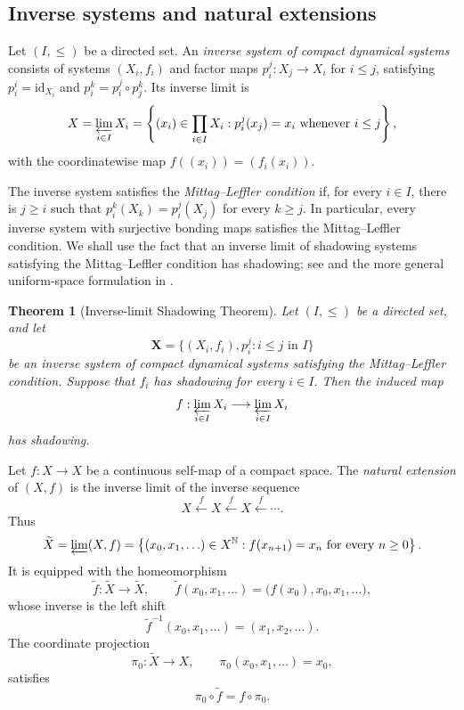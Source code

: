 \documentclass[12pt]{amsart}
\newtheorem{theorem}{Theorem}[section]
\theoremstyle{definition}
\numberwithin{equation}{section}
\theoremstyle{remark}
\def\id{{\text{id}}}
\begin{document}
\subsection{Inverse systems and natural extensions}

Let $(I,\leq)$ be a directed set. An \emph{inverse system of compact dynamical
systems} consists of systems $(X_i,f_i)$ and factor maps
$p_i^j:X_j\to X_i$ for $i\leq j$, satisfying
$p_i^i=\id_{X_i}$ and $p_i^k=p_i^j\circ p_j^k$. Its inverse limit is
\[
X=\varprojlim_{i\in I}X_i
=
\left\{(x_i)\in\prod_{i\in I}X_i:
 p_i^j(x_j)=x_i\text{ whenever }i\leq j\right\},
\]
with the coordinatewise map $f((x_i))=(f_i(x_i))$.

The inverse system satisfies the \emph{Mittag--Leffler condition} if, for every
$i\in I$, there is $j\geq i$ such that
$p_i^k(X_k)=p_i^j(X_j)$ for every $k\geq j$. In particular, every inverse
system with surjective bonding maps satisfies the Mittag--Leffler condition.
We shall use the fact that an inverse limit of shadowing systems satisfying the
Mittag--Leffler condition has shadowing; see \cite[Theorem~8]{GM} and the more
general uniform-space formulation in \cite{Bernardes}.

\begin{theorem}[Inverse-limit Shadowing Theorem]\label{thm:inverse-limit-shadowing}
 Let $(I,\leq)$ be a directed set, and let \[ \mathbf X = \bigl\{(X_i,f_i),p_i^j:i\leq j\text{ in }I\bigr\} \] be an inverse system of compact dynamical systems satisfying the Mittag--Leffler condition. 
 Suppose that $f_i$ has shadowing for every $i\in I$. Then the induced map \[ f:\varprojlim_{i\in I}X_i\longrightarrow \varprojlim_{i\in I}X_i \] has shadowing. 
 \end{theorem}

Let $f:X\to X$ be a continuous self-map of a compact space. The
\emph{natural extension} of $(X,f)$ is the inverse limit of the
inverse sequence
\[
X
\xleftarrow{\,f\,}
X
\xleftarrow{\,f\,}
X
\xleftarrow{\,f\,}
\cdots.
\]
Thus
\[
\widetilde X
=
\varprojlim(X,f)
=
\left\{
(x_0,x_1,\ldots)\in X^{\mathbb N}:
f(x_{n+1})=x_n\text{ for every }n\geq0
\right\}.
\]
It is equipped with the homeomorphism
\[
\widetilde f:\widetilde X\to\widetilde X,
\qquad
\widetilde f(x_0,x_1,\ldots)
=
\bigl(f(x_0),x_0,x_1,\ldots\bigr),
\]
whose inverse is the left shift
\[
\widetilde f^{-1}(x_0,x_1,\ldots)
=
(x_1,x_2,\ldots).
\]
The coordinate projection
\[
\pi_0:\widetilde X\to X,
\qquad
\pi_0(x_0,x_1,\ldots)=x_0,
\]
satisfies
\[
\pi_0\circ\widetilde f=f\circ\pi_0.
\]
\end{document}

